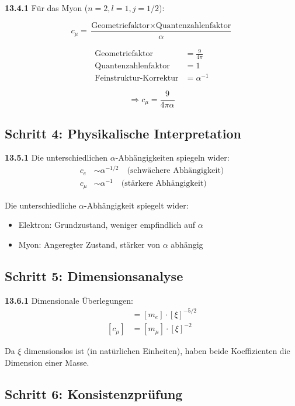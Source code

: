 \noindent \textbf{13.4.1} Für das Myon ($n=2, l=1, j=1/2$):

\[
c_\mu = \frac{\text{Geometriefaktor} \times \text{Quantenzahlenfaktor}}{\alpha}
\]

\begin{align*}
	\text{Geometriefaktor} &= \frac{9}{4\pi} \\
	\text{Quantenzahlenfaktor} &= 1 \\
	\text{Feinstruktur-Korrektur} &= \alpha^{-1}
\end{align*}

\[
\Rightarrow c_\mu = \frac{9}{4\pi\alpha}
\]

\subsection{Schritt 4: Physikalische Interpretation}

\noindent \textbf{13.5.1} Die unterschiedlichen $\alpha$-Abhängigkeiten spiegeln wider:
\begin{align*}
	c_e &\sim \alpha^{-1/2} \quad \text{(schwächere Abhängigkeit)} \\
	c_\mu &\sim \alpha^{-1} \quad \text{(stärkere Abhängigkeit)}
\end{align*}

Die unterschiedliche $\alpha$-Abhängigkeit spiegelt wider:
\begin{itemize}
	\item Elektron: Grundzustand, weniger empfindlich auf $\alpha$
	\item Myon: Angeregter Zustand, stärker von $\alpha$ abhängig
\end{itemize}

\subsection{Schritt 5: Dimensionsanalyse}

\noindent \textbf{13.6.1} Dimensionale Überlegungen:
\begin{align*}
	[c_e] &= [m_e] \cdot [\xi]^{-5/2} \\
	[c_\mu] &= [m_\mu] \cdot [\xi]^{-2}
\end{align*}

Da $\xi$ dimensionslos ist (in natürlichen Einheiten), haben beide Koeffizienten die Dimension einer Masse.

\subsection{Schritt 6: Konsistenzprüfung}

